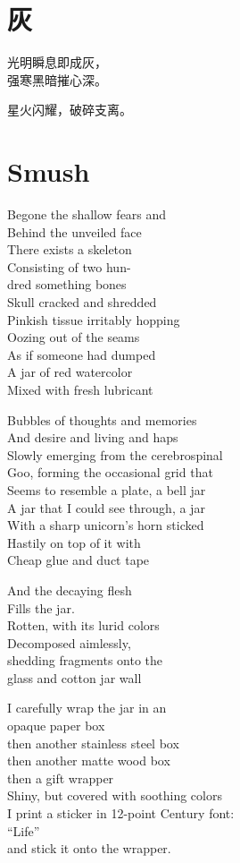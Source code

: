 \documentclass[parskip=full,12pt,oneside,openany,a5paper,numbers=endperiod]{scrbook}
\begin{document}
\endgroup

\chapter{灰}
\begingroup\addtolength{\baselineskip}{0.75ex}

光明瞬息即成灰，\\
强寒黑暗摧心深。

星火闪耀，破碎支离。

\endgroup

\chapter{Smush}

Begone the shallow fears and\\
Behind the unveiled face\\
There exists a skeleton\\
Consisting of two hun-\\
dred something bones\\
Skull cracked and shredded\\
Pinkish tissue irritably hopping\\
Oozing out of the seams\\
As if someone had dumped\\
A jar of red watercolor\\
Mixed with fresh lubricant

Bubbles of thoughts and memories\\
And desire and living and haps\\
Slowly emerging from the cerebrospinal\\
Goo, forming the occasional grid that\\
Seems to resemble a plate, a bell jar\\
A jar that I could see through, a jar\\
With a sharp unicorn's horn sticked\\
Hastily on top of it with\\
Cheap glue and duct tape

And the decaying flesh\\
Fills the jar.\\
Rotten, with its lurid colors\\
Decomposed aimlessly,\\
shedding fragments onto the\\
glass and cotton jar wall

I carefully wrap the jar in an\\
opaque paper box\\
then another stainless steel box\\
then another matte wood box\\
then a gift wrapper\\
Shiny, but covered with soothing colors\\
I print a sticker in 12-point Century font:\\
\qquad ``Life''\\
and stick it onto the wrapper.
\end{document}
